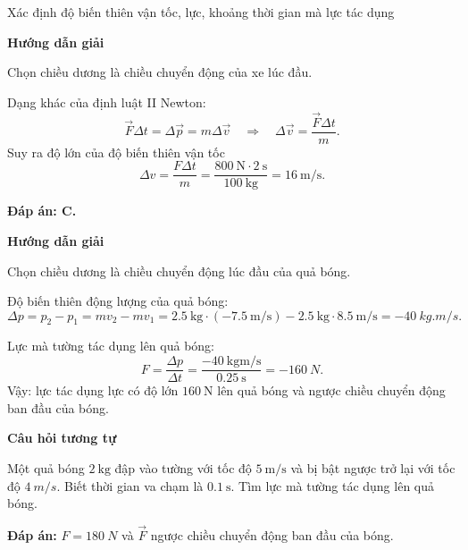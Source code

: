 \begin{dang}{Xác định độ biến thiên vận tốc, lực, khoảng thời gian mà lực tác dụng}
	{	\begin{center}
			\textbf{Hướng dẫn giải}
		\end{center}
		
		Chọn chiều dương là chiều chuyển động của xe lúc đầu.
		
		Dạng khác của định luật II Newton:
		\begin{equation*}
			\vec{F}\Delta t= \Delta \vec{p} =m \Delta \vec{v} \quad\Rightarrow\quad \Delta \vec{v} = \dfrac{\vec{F} \Delta t}{m}.
		\end{equation*}
		Suy ra độ lớn của độ biến thiên vận tốc 
		\begin{equation*}
			\Delta  v=\dfrac{F\Delta t}{m}=\dfrac{\SI{800}{\newton}\cdot\SI{2}{\second}}{\SI{100}{\kilogram}}= 16\ \text{m/s}.
		\end{equation*}
		
		\textbf{Đáp án: C.}
	}
	{\begin{center}
			\textbf{Hướng dẫn giải}
		\end{center}
		Chọn chiều dương là chiều chuyển động lúc đầu của quả bóng. 
		
		Độ biến thiên động lượng của quả bóng:
		$$\Delta p =p_2-p_1=mv_2-mv_1=\SI{2.5}{\kilogram}\cdot(\SI{-7.5}{\meter/\second})-\SI{2.5}{\kilogram}\cdot\SI{8.5}{\meter/\second}= \SI{-40}{kg.m/s}.$$
		
		Lực mà tường tác dụng lên quả bóng: $$F=\dfrac{\Delta p}{\Delta t} =\dfrac{\SI{-40}{\kilogram\meter/\second}}{\SI{0.25}{\second}}= \SI{-160}{N}.$$
		Vậy: lực tác dụng lực có độ lớn $\SI{160}{\newton}$ lên quả bóng và ngược chiều chuyển động ban đầu của bóng.
		
		\begin{center}
			\textbf{Câu hỏi tương tự}
		\end{center}
		
		Một quả bóng $\SI{2}{\kilogram}$ đập vào tường với tốc độ $\SI{5}{\meter/\second}$ và bị bật ngược trở lại với tốc độ $\SI{4}{m/s}$. Biết thời gian va chạm là $\SI{0.1}{\second}$. Tìm lực mà tường tác dụng lên quả bóng.
		
		\textbf{Đáp án:} $F=\SI{180}{N}$ và $\vec F$ ngược chiều chuyển động ban đầu của bóng.
	}
\end{dang}